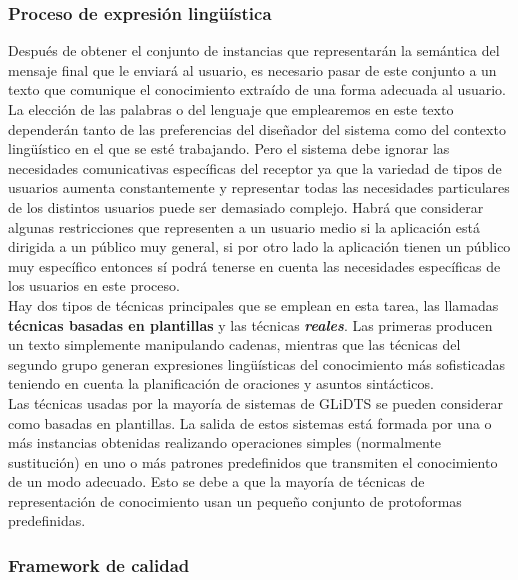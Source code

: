 \documentclass[10pt,a4paper]{article}
\begin{document}
\subsubsection{Proceso de expresión lingüística}

Después de obtener el conjunto de instancias que representarán la semántica del mensaje final que le enviará al usuario, es necesario pasar de este conjunto a un texto que comunique el conocimiento extraído de una forma adecuada al usuario.\\

La elección de las palabras o del lenguaje que emplearemos en este texto dependerán tanto de las preferencias del diseñador del sistema como del contexto lingüístico en el que se esté trabajando. Pero el sistema debe ignorar las necesidades comunicativas específicas del receptor ya que la variedad de tipos de usuarios aumenta constantemente y representar todas las necesidades particulares de los distintos usuarios puede ser demasiado complejo. Habrá que considerar algunas restricciones que representen a un usuario medio si la aplicación está dirigida a un público muy general, si por otro lado la aplicación tienen un público muy específico entonces sí podrá tenerse en cuenta las necesidades específicas de los usuarios en este proceso.\\

Hay dos tipos de técnicas principales que se emplean en esta tarea, las llamadas \textbf{técnicas basadas en plantillas} y las técnicas \textbf{\textit{reales}}. Las primeras producen un texto simplemente manipulando cadenas, mientras que las técnicas del segundo grupo generan expresiones lingüísticas del conocimiento más sofisticadas teniendo en cuenta la planificación de oraciones y asuntos sintácticos.\\

Las técnicas usadas por la mayoría de sistemas de GLiDTS se pueden considerar como basadas en plantillas. La salida de estos sistemas está formada por una o más instancias obtenidas realizando operaciones simples (normalmente sustitución) en uno o más patrones predefinidos que transmiten el conocimiento de un modo adecuado. Esto se debe a que la mayoría de técnicas de representación de conocimiento usan un pequeño conjunto de protoformas predefinidas.

\subsubsection{Framework de calidad}
\end{document}
